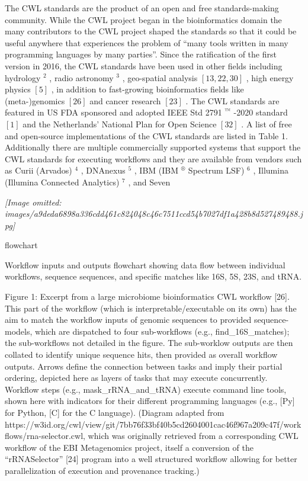 \documentclass[
]{article}
\begin{document}
The CWL standards are the product of an open and free standards-making
community. While the CWL project began in the bioinformatics domain the
many contributors to the CWL project shaped the standards so that it
could be useful anywhere that experiences the problem of ``many tools
written in many programming languages by many parties''. Since the
ratification of the first version in 2016, the CWL standards have been
used in other fields including hydrology \(^{2}\) , radio astronomy
\(^{3}\) , geo-spatial analysis \([13, 22, 30]\) , high energy physics
\([5]\) , in addition to fast-growing bioinformatics fields like
(meta-)genomics \([26]\) and cancer research \([23]\) . The CWL
standards are featured in US FDA sponsored and adopted IEEE Std 2791
\(^{™}\) -2020 standard \([1]\) and the Netherlands' National Plan for
Open Science \([32]\) . A list of free and open-source implementations
of the CWL standards are listed in Table 1. Additionally there are
multiple commercially supported systems that support the CWL standards
for executing workflows and they are available from vendors such as
Curii (Arvados) \(^{4}\) , DNAnexus \(^{5}\) , IBM (IBM \(^{®}\)
Spectrum LSF) \(^{6}\) , Illumina (Illumina Connected Analytics)
\(^{7}\) , and Seven

\textit{[Image omitted: images/a9deda6898a336cdd461c824048c46c7511ccd54b7027df1a428b8d527489488.jpg]}

flowchart

Workflow inputs and outputs flowchart showing data flow between
individual workflows, sequence sequences, and specific matches like 16S,
5S, 23S, and tRNA.

Figure 1: Excerpt from a large microbiome bioinformatics CWL workflow
{[}26{]}. This part of the workflow (which is interpretable/executable
on its own) has the aim to match the workflow inputs of genomic
sequences to provided sequence-models, which are dispatched to four
sub-workflows (e.g., find\_16S\_matches); the sub-workflows not detailed
in the figure. The sub-worklow outputs are then collated to identify
unique sequence hits, then provided as overall workflow outputs. Arrows
define the connection between tasks and imply their partial ordering,
depicted here as layers of tasks that may execute concurrently. Workflow
steps (e.g., mask\_rRNA\_and\_tRNA) execute command line tools, shown
here with indicators for their different programming languages (e.g.,
{[}Py{]} for Python, {[}C{]} for the C language). (Diagram adapted from
https://w3id.org/cwl/view/git/7bb76f33bf40b5cd2604001cac46f967a209c47f/workflows/rna-selector.cwl,
which was originally retrieved from a corresponding CWL workflow of the
EBI Metagenomics project, itself a conversion of the ``rRNASelector''
{[}24{]} program into a well structured workflow allowing for better
parallelization of execution and provenance tracking.)
\end{document}

